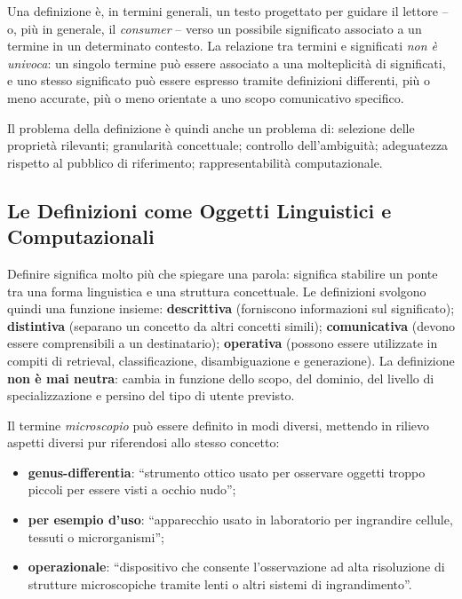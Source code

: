 \documentclass[12pt,a4paper]{article}
\begin{document}
\begin{defbox}
Una definizione \`e, in termini generali, un testo progettato per guidare il lettore -- o, pi\`u in generale, il \emph{consumer} -- verso un possibile significato associato a un termine in un determinato contesto. La relazione tra termini e significati \emph{non \`e univoca}: un singolo termine pu\`o essere associato a una molteplicit\`a di significati, e uno stesso significato pu\`o essere espresso tramite definizioni differenti, pi\`u o meno accurate, pi\`u o meno orientate a uno scopo comunicativo specifico.
\end{defbox}

Il problema della definizione \`e quindi anche un problema di: selezione delle propriet\`a rilevanti; granularit\`a concettuale; controllo dell'ambiguit\`a; adeguatezza rispetto al pubblico di riferimento; rappresentabilit\`a computazionale.

\subsection{Le Definizioni come Oggetti Linguistici e Computazionali}

Definire significa molto pi\`u che spiegare una parola: significa stabilire un ponte tra una forma linguistica e una struttura concettuale. Le definizioni svolgono quindi una funzione insieme: \textbf{descrittiva} (forniscono informazioni sul significato); \textbf{distintiva} (separano un concetto da altri concetti simili); \textbf{comunicativa} (devono essere comprensibili a un destinatario); \textbf{operativa} (possono essere utilizzate in compiti di retrieval, classificazione, disambiguazione e generazione). La definizione \textbf{non \`e mai neutra}: cambia in funzione dello scopo, del dominio, del livello di specializzazione e persino del tipo di utente previsto.

\begin{examplebox}
Il termine \textit{microscopio} pu\`o essere definito in modi diversi, mettendo in rilievo aspetti diversi pur riferendosi allo stesso concetto:
\begin{itemize}
  \item \textbf{genus-differentia}: ``strumento ottico usato per osservare oggetti troppo piccoli per essere visti a occhio nudo'';
  \item \textbf{per esempio d'uso}: ``apparecchio usato in laboratorio per ingrandire cellule, tessuti o microrganismi'';
  \item \textbf{operazionale}: ``dispositivo che consente l'osservazione ad alta risoluzione di strutture microscopiche tramite lenti o altri sistemi di ingrandimento''.
\end{itemize}
\end{examplebox}
\end{document}
